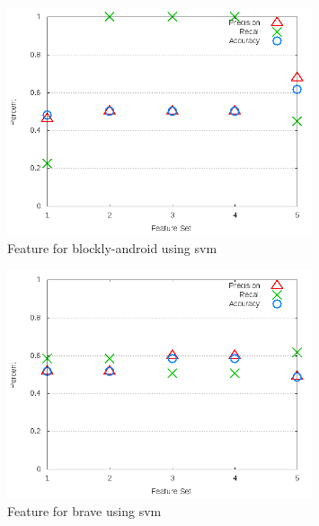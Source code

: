 \begin{figure}[!t]
\centering
\includegraphics[width=0.8\textwidth]{images/svm/test_3/blockly-android_sample_range.png}
\caption{Feature for blockly-android using \gls{svm}}
\label{fig:test_3_blockly-android_svm}
\end{figure}

\begin{figure}[!t]
\centering
\includegraphics[width=0.8\textwidth]{images/svm/test_3/brave_sample_range.png}
\caption{Feature for brave using \gls{svm}}
\label{fig:test_3_brave_svm}
\end{figure}

